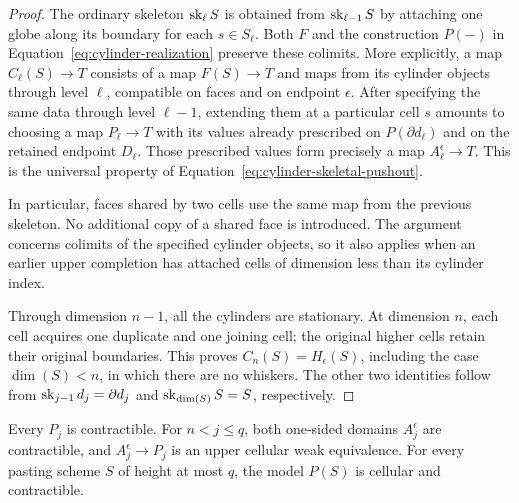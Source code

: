 \begin{proof}
The ordinary skeleton \(\operatorname{sk}_\ell S\) is obtained from
\(\operatorname{sk}_{\ell-1}S\) by attaching one globe along its boundary for
each \(s\in S_\ell\).  Both \(F\) and the construction
\(P(-)\) in Equation~\eqref{eq:cylinder-realization} preserve these
colimits.  More explicitly, a map \(C_\ell(S)\to T\) consists of
a map \(F(S)\to T\) and maps from its cylinder objects through
level \(\ell\), compatible on faces and on endpoint
\(\epsilon\).  After specifying the same data through level
\(\ell-1\), extending them at a particular cell \(s\) amounts
to choosing a map \(P_\ell\to T\) with its values already
prescribed on \(P(\partial d_\ell)\) and on the retained
endpoint \(D_\ell\).  Those prescribed values form precisely a
map \(A_\ell^\epsilon\to T\).  This is the universal property
of Equation~\eqref{eq:cylinder-skeletal-pushout}.

In particular, faces shared by two cells use the same map from the
previous skeleton.  No additional copy of a shared face is introduced.
The argument concerns colimits of the specified cylinder objects, so it
also applies when an earlier upper completion has attached cells of
dimension less than its cylinder index.

Through dimension \(n-1\), all the cylinders are stationary.  At
dimension \(n\), each cell acquires one duplicate and one joining
cell; the original higher cells retain their original boundaries.
This proves \(C_n(S)=H_\epsilon(S)\), including the case
\(\dim(S)<n\), in which there are no whiskers.  The other two
identities follow from \(\operatorname{sk}_{j-1}d_j=\partial d_j\) and
\(\operatorname{sk}_{\dim(S)}S=S\), respectively.
\end{proof}

\begin{proposition}\label{prop:cylinder-contractibility}
Every \(P_j\) is contractible.  For \(n<j\le q\), both
one-sided domains \(A_j^\epsilon\) are contractible, and
\(A_j^\epsilon\to P_j\) is an upper cellular weak equivalence.
For every pasting scheme \(S\) of height at most \(q\), the model
\(P(S)\) is cellular and contractible.
\end{proposition}

